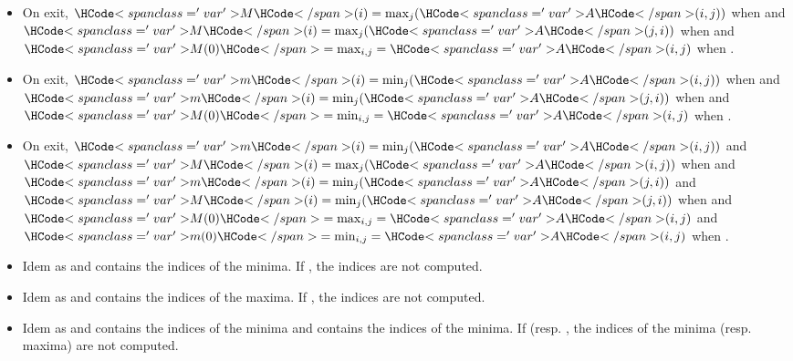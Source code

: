 \begin{itemize}
\item {}
  \sshortdescribe On exit, $\var{M}(i) = \max_{j}(\var{A}(i, j))$ when 
  and $\var{M}(i) = \max_{j}(\var{A}(j, i))$ when  and $\var{M(0)} =
  \max_{i,j} = \var{A}(i, j)$ when .

\item {}
  \sshortdescribe On exit, $\var{m}(i) = \min_{j}(\var{A}(i, j))$ when 
  and $\var{m}(i) = \min_{j}(\var{A}(j, i))$ when  and $\var{M(0)} =
  \min_{i,j} = \var{A}(i, j)$ when .

\item {}
  \sshortdescribe On exit, $\var{m}(i) = \min_{j}(\var{A}(i, j))$ and $\var{M}(i) =
  \max_{j}(\var{A}(i, j))$ when  and $\var{m}(i) = \min_{j}(\var{A}(j, i))$
  and $\var{M}(i) = \min_{j}(\var{A}(j, i))$ when  and $\var{M(0)} =
  \max_{i,j} = \var{A}(i, j)$ and  $\var{m(0)} =\min_{i,j} = \var{A}(i, j)$ when .
  
\item {}
  \sshortdescribe Idem as  and  contains the
  indices of the minima. If , the indices are not computed.

\item {}
  \sshortdescribe Idem as  and  contains the
  indices of the maxima. If , the indices are not computed.

\item {}
  \sshortdescribe Idem as  and  contains the
  indices of the minima and  contains the indices of the minima. If
   (resp. , the indices of the minima
  (resp. maxima) are not computed.


\end{itemize}
